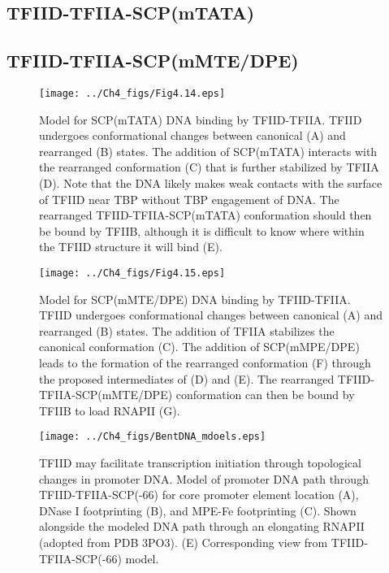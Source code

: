 \subsection{TFIID-TFIIA-SCP(mTATA)}

\subsection{TFIID-TFIIA-SCP(mMTE/DPE)} 

\begin{figure}
\centering
\texttt{[image: ../Ch4\_figs/Fig4.14.eps]}
\caption[Model for SCP(mTATA) DNA binding by TFIID-TFIIA]{Model for SCP(mTATA) DNA binding by TFIID-TFIIA. TFIID undergoes conformational changes between canonical (A) and rearranged (B) states. The addition of SCP(mTATA) interacts with the rearranged conformation (C) that is further stabilized by TFIIA (D). Note that the DNA likely makes weak contacts with the surface of TFIID near TBP without TBP engagement of DNA. The rearranged TFIID-TFIIA-SCP(mTATA) conformation should then be bound by TFIIB, although it is difficult to know where within the TFIID structure it will bind (E).}
\label{fig:Fig4.14}
\end{figure}

\begin{figure}
\centering
\texttt{[image: ../Ch4\_figs/Fig4.15.eps]}
\caption[Model for SCP(mMTE/DPE) DNA binding by TFIID-TFIIA]{Model for SCP(mMTE/DPE) DNA binding by TFIID-TFIIA. TFIID undergoes conformational changes between canonical (A) and rearranged (B) states. The addition of TFIIA stabilizes the canonical conformation (C). The addition of SCP(mMPE/DPE) leads to the formation of the rearranged conformation (F) through the proposed intermediates of (D) and (E). The rearranged TFIID-TFIIA-SCP(mMTE/DPE) conformation can then be bound by TFIIB to load RNAPII (G).}
\label{fig:Fig4.15}
\end{figure}

\begin{figure}
\centering
\texttt{[image: ../Ch4\_figs/BentDNA\_mdoels.eps]}
\caption[TFIID may facilitate transcription initiation through topological changes in promoter DNA]{TFIID may facilitate transcription initiation through topological changes in promoter DNA. Model of promoter DNA path through TFIID-TFIIA-SCP(-66) for core promoter element location (A), DNase I footprinting (B), and MPE-Fe footprinting (C). Shown alongside the modeled DNA path through an elongating RNAPII (adopted from PDB 3PO3). (E) Corresponding view from TFIID-TFIIA-SCP(-66) model.}
\label{fig:BentDNA}
\end{figure}
